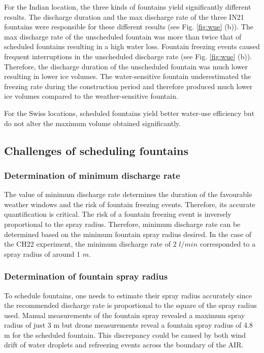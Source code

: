 \documentclass[tc, manuscript]{copernicus}
\begin{document}
For the Indian location, the three kinds of fountains yield significantly different results.  The discharge
duration and the max discharge rate of the three IN21 fountains were responsible for these different results
(see Fig. \ref{fig:wue} (b)). The max discharge rate of the unscheduled fountain was more than twice that of
scheduled fountains resulting in a high water loss.  Fountain freezing events caused frequent interruptions in
the unscheduled discharge rate (see Fig. \ref{fig:wue} (b)). Therefore, the discharge duration of the
unscheduled fountain was much lower resulting in lower ice volumes. The water-sensitive fountain underestimated
the freezing rate during the construction period and therefore produced much lower ice volumes compared to the
weather-sensitive fountain.

For the Swiss locations, scheduled fountains yield better water-use efficiency but do not alter the maximum
volume obtained significantly. 

\subsection{Challenges of scheduling fountains}

\subsubsection{Determination of minimum discharge rate}

The value of minimum discharge rate determines the duration of the favourable weather windows and the risk of
fountain freezing events. Therefore, its accurate quantification is critical. The risk of a fountain freezing
event is inversely proportional to the spray radius. Therefore, minimum discharge rate can be determined based
on the minimum fountain spray radius desired. In the case of the CH22 experiment, the minimum discharge rate of
2 $l/min$ corresponded to a spray radius of around 1 $m$.

\subsubsection{Determination of fountain spray radius}

To schedule fountains, one needs to estimate their spray radius accurately since the recommended discharge rate
is proportional to the square of the spray radius used.  Manual measurements of the fountain spray revealed a
maximum spray radius of just 3 m but drone measurements reveal a fountain spray radius of 4.8 m for the
scheduled fountain. This discrepancy could be caused by both wind drift of water droplets and refreezing events
across the boundary of the AIR. 
\end{document}
